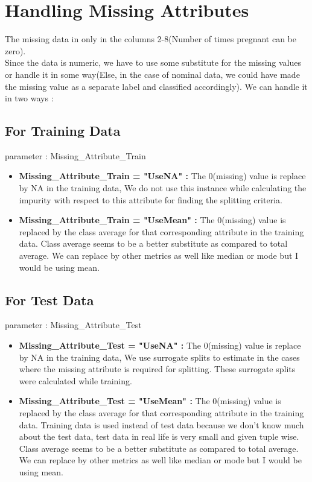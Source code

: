 \documentclass[12pt]{article}%
\begin{document}
\section{Handling Missing Attributes}
The missing data in only in the columns 2-8(Number of times pregnant can be zero).\\
Since the data is numeric, we have to use some substitute for the missing values or handle it in some way(Else, in the case of nominal data, we could have made the missing value as a separate label and classified accordingly). We can handle it in two ways :
\subsection{For Training Data}
parameter : Missing\_Attribute\_Train
\begin{itemize}
\item {\bf Missing\_Attribute\_Train = "UseNA" : } The 0(missing) value is replace by NA in the training data, We do not use this instance while calculating the impurity with respect to this attribute for finding the splitting criteria. 
\item {\bf Missing\_Attribute\_Train = "UseMean" : } The 0(missing) value is replaced by the class average for that corresponding attribute in the training data. Class average seems to be a better substitute as compared to total average. We can replace by other metrics as well like median or mode but I would be using mean. 
\end{itemize}

\subsection{For Test Data}
parameter : Missing\_Attribute\_Test
\begin{itemize}
\item {\bf Missing\_Attribute\_Test = "UseNA" : } The 0(missing) value is replace by NA in the training data, We use surrogate splits to estimate in the cases where the missing attribute is required for splitting. These surrogate splits were calculated while training. 

\item {\bf Missing\_Attribute\_Test = "UseMean" : } The 0(missing) value is replaced by the class average for that corresponding attribute in the training data. Training data is used instead of test data because we don't know much about the test data, test data in real life is very small and given tuple wise. Class average seems to be a better substitute as compared to total average. We can replace by other metrics as well like median or mode but I would be using mean. 
\end{itemize}
\end{document}

